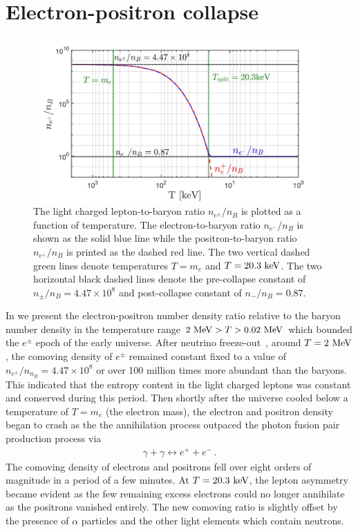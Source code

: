 \documentclass[a4paper]{article}
\begin{document}
\section{Electron-positron collapse}\label{sec:Collapse}
\begin{figure}[h]
    \centering
    \includegraphics[width=\textwidth]{EEPlasmaDensityRatio.jpg}
    \caption{The light charged lepton-to-baryon ratio $n_{e^{\pm}}/n_{B}$ is plotted as a function of temperature. The electron-to-baryon ratio $n_{e^{-}}/n_{B}$ is shown as the solid blue line while the positron-to-baryon ratio $n_{e^{+}}/n_{B}$ is printed as the dashed red line. The two vertical dashed green lines denote temperatures $T=m_{e}$ and $T=20.3\text{ keV}$. The two horizontal black dashed lines denote the pre-collapse constant of $n_{\pm}/n_{B}=4.47\times10^{8}$ and post-collapse constant of $n_{-}/n_{B}=0.87$.}
    \label{DensityRatio} 
\end{figure}
\noindent In  we present the electron-positron number density ratio relative to the baryon number density in the temperature range $2\text{ MeV}>T>0.02\text{ MeV}$ which bounded the $e^{\pm}$ epoch of the early universe. After neutrino freeze-out~\cite{birrell2014relic}, around $T=2\text{ MeV}$, the comoving density of $e^{\pm}$ remained constant fixed to a value of $n_{e^{\pm}}/n_{n_{B}}=4.47\times10^{8}$ or over 100 million times more abundant than the baryons. This indicated that the entropy content in the light charged leptons was constant and conserved during this period. Then shortly after the universe cooled below a temperature of $T=m_{e}$ (the electron mass), the electron and positron density began to crash as the the annihilation process outpaced the photon fusion pair production process via
\begin{align}
    \label{fusion}
    \gamma+\gamma\leftrightarrow e^{+}+e^{-}\,.
\end{align}
The comoving density of electrons and positrons fell over eight orders of magnitude in a period of a few minutes. At $T=20.3\text{ keV}$, the lepton asymmetry became evident as the few remaining excess electrons could no longer annihilate as the positrons vanished entirely. The new comoving ratio is slightly offset by the presence of $\alpha$ particles and the other light elements which contain neutrons.
\end{document}
